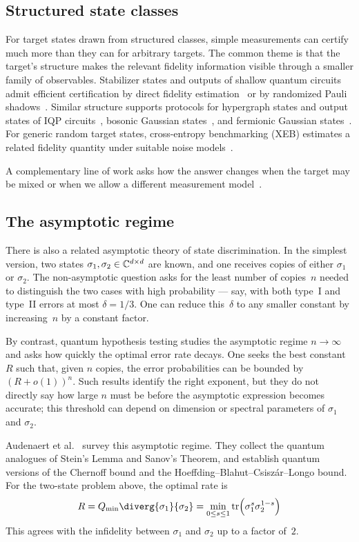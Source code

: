 \subsection{Structured state classes} \label{sec:structured-classes}

For target states drawn from structured classes, simple measurements can certify much more than they can for arbitrary targets. The common theme is that the target's structure makes the relevant fidelity information visible through a smaller family of observables. Stabilizer states and outputs of shallow quantum circuits admit efficient certification by direct fidelity estimation~\cite{flammia2011direct} or by randomized Pauli shadows~\cite{huang2020predicting}. Similar structure supports protocols for hypergraph states and output states of IQP circuits~\cite{takeuchi2018verification}, bosonic Gaussian states~\cite{aolita2015reliable}, and fermionic Gaussian states~\cite{gluza2018fidelity}. For generic random target states, cross-entropy benchmarking (XEB) estimates a related fidelity quantity under suitable noise models~\cite{arute2019quantum}.

A complementary line of work asks how the answer changes when the target may be mixed or when we allow a different measurement model~\cite{buadescu2019quantum}.

\subsection{The asymptotic regime} \label{sec:asympt-state-discrim}

There is also a related asymptotic theory of state discrimination. In the simplest version, two states $\sigma_1,\sigma_2 \in \mathbb{C}^{d \times d}$ are known, and one receives copies of either $\sigma_1$ or $\sigma_2$. The non-asymptotic question asks for the least number of copies~$n$ needed to distinguish the two cases with high probability --- say, with both type~I and type~II errors at most $\delta=1/3$. One can reduce this~$\delta$ to any smaller constant by increasing~$n$ by a constant factor.

By contrast, quantum hypothesis testing studies the asymptotic regime $n \to \infty$ and asks how quickly the optimal error rate decays. One seeks the best constant~$R$ such that, given $n$ copies, the error probabilities can be bounded by $(R+o(1))^n$. Such results identify the right exponent, but they do not directly say how large $n$ must be before the asymptotic expression becomes accurate; this threshold can depend on dimension or spectral parameters of $\sigma_1$ and $\sigma_2$.

Audenaert et al.~\cite{audenaert2008asymptotic} survey this asymptotic regime. They collect the quantum analogues of Stein's Lemma and Sanov's Theorem, and establish quantum versions of the Chernoff bound and the Hoeffding--Blahut--Csisz\'{a}r--Longo bound. For the two-state problem above, the optimal rate is
\[
    R = Q_{\text{min}}\diverg{\sigma_1}{\sigma_2} = \min_{0 \leq s \leq 1}\tr(\sigma_1^s \sigma_2^{1-s})
\]
This agrees with the infidelity between $\sigma_1$ and $\sigma_2$ up to a factor of~$2$.
